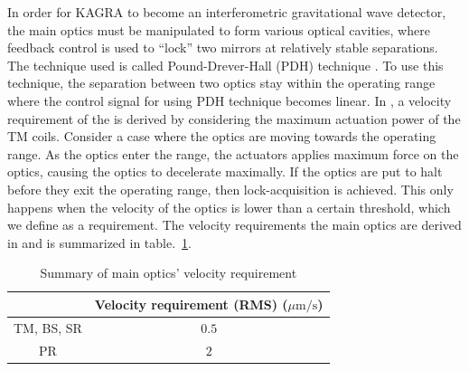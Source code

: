 In order for KAGRA to become an interferometric gravitational wave detector, the main optics must be manipulated to form various optical cavities, where feedback control is used to ``lock'' two mirrors at relatively stable separations.
The technique used is called Pound-Drever-Hall (PDH) technique \cite{doi:10.1119/1.1286663}.
To use this technique, the separation between two optics stay within the operating range where the control signal for using PDH technique becomes linear.
In \cite{Sekiguchi:2016bmv}, a velocity requirement of the is derived by considering the maximum actuation power of the TM coils.
Consider a case where the optics are moving towards the operating range.
As the optics enter the range, the actuators applies maximum force on the optics, causing the optics to decelerate maximally.
If the optics are put to halt before they exit the operating range, then lock-acquisition is achieved.
This only happens when the velocity of the optics is lower than a certain threshold, which we define as a requirement.
The velocity requirements the main optics are derived in \cite{Sekiguchi:2016bmv} and is summarized in table.~\ref{table:velocity_requirement}.
\begin{table}[!h]
	\centering
	\begin{tabular}{|c|c|}
		\hline
		& Velocity requirement (RMS) ($\mu\mathrm{m}/\mathrm{s}$)\\
		\hline
		TM, BS, SR &  $0.5$\\
		\hline
		PR &  $2$\\
		\hline
	\end{tabular}
	\caption{Summary of main optics' velocity requirement}
	\label{table:velocity_requirement}
\end{table}












